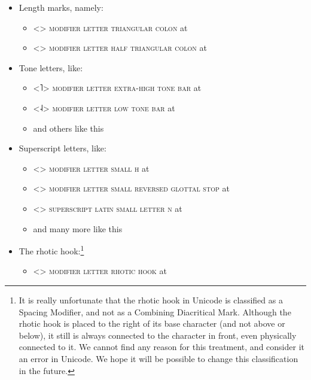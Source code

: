 \begin{itemize}
  
	\item[] Length marks, namely: 
	\begin{itemize}
	  \item[] <> \textsc{modifier letter triangular colon} at 
	  \item[] <> \textsc{modifier letter half triangular colon} at 
	\end{itemize}
	 
	\item[] Tone letters, like: 
	\begin{itemize} 
	  \item[] <˥> \textsc{modifier letter extra-high tone bar} at 
	  \item[] <˨> \textsc{modifier letter low tone bar} at 
	  \item[] and others like this
	\end{itemize}
	
	\item[] Superscript letters, like:
	\begin{itemize}
	  \item[] <> \textsc{modifier letter small h} at 
	  \item[] <> \textsc{modifier letter small reversed glottal stop} at 
	  \item[] <> \textsc{superscript latin small letter n} at 
	  \item[] and many more like this
	\end{itemize}
	
	\item[] The rhotic hook:\footnote{It is really unfortunate that the rhotic hook
         in Unicode is classified as a Spacing Modifier, and not as a Combining 
         Diacritical Mark. Although the rhotic hook is placed to the right of its 
         base character (and not above or below), it still is always connected 
         to the character in front, even physically connected to it. We cannot 
         find any reason for this treatment, and consider it an error in 
         Unicode. We hope it will be possible to change this classification in 
         the future.}
	\begin{itemize}
	  \item[] <> \textsc{modifier letter rhotic hook} at 
	\end{itemize}
	
\end{itemize}

